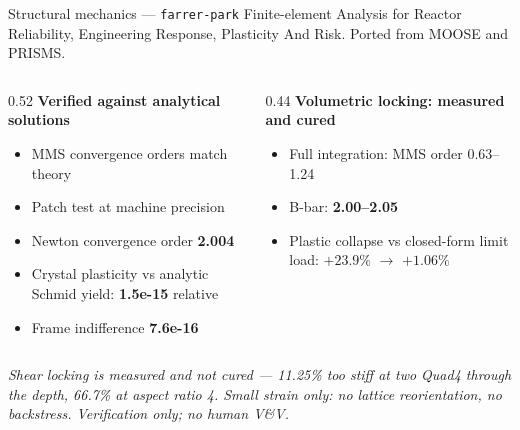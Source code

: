 \documentclass[aspectratio=169,11pt]{beamer}
\newcommand{\caveat}[1]{{\footnotesize\color{opmuted}\textit{#1}}}
\begin{document}
\begin{frame}{Structural mechanics --- \texttt{farrer-park}}
  Finite-element Analysis for Reactor Reliability, Engineering Response,
  Plasticity And Risk. Ported from MOOSE \cite{moose} and PRISMS.
  \vspace{0.6em}
  \begin{columns}[T]
    \begin{column}{0.52\textwidth}
      \textbf{Verified against analytical solutions}
      \begin{itemize}
        \item MMS convergence orders match theory
        \item Patch test at machine precision
        \item Newton convergence order \textbf{2.004}
        \item Crystal plasticity vs analytic Schmid yield: \textbf{1.5e-15} relative
        \item Frame indifference \textbf{7.6e-16}
      \end{itemize}
    \end{column}
    \begin{column}{0.44\textwidth}
      \textbf{Volumetric locking: measured and cured}
      \begin{itemize}
        \item Full integration: MMS order 0.63--1.24
        \item B-bar: \textbf{2.00--2.05}
        \item Plastic collapse vs closed-form limit load: $+23.9\%$ $\rightarrow$ $\mathbf{+1.06\%}$
      \end{itemize}
    \end{column}
  \end{columns}
  \vspace{0.8em}
  \caveat{Shear locking is measured and \alert{not} cured --- 11.25\% too stiff at two
  Quad4 through the depth, 66.7\% at aspect ratio 4. Small strain only: no lattice
  reorientation, no backstress. Verification only; no human V\&V.}
\end{frame}
\end{document}

